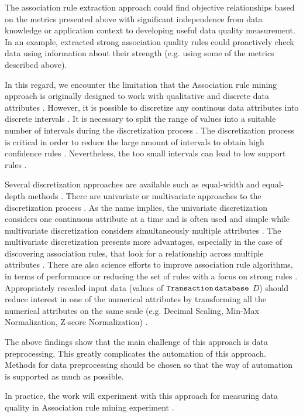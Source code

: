 		The association rule extraction approach could find objective relationships based on the metrics presented above with significant independence from data knowledge or application context to developing useful data quality measurement. In an example, extracted strong association quality rules could proactively check data using information about their strength (e.g. using some of the metrics described above).
		
		In this regard, we encounter the limitation that the Association rule mining approach is originally designed to work with qualitative and discrete data attributes   \cite{Moreno2007}. However, it is possible to discretize any continous data attributes into discrete intervals \cite{Moreno2007}. It is necessary to split the range of values into a suitable number of intervals during the discretization process \cite{Moreno2007}. The discretization process is critical in order to reduce the large amount of intervals to obtain high confidence rules \cite{Moreno2007}. Nevertheless, the too small intervals can lead to low support rules \cite{Moreno2007}.
		
		Several discretization approaches are available such as equal-width and equal-depth methods \cite{Moreno2007}. There are univariate or multivariate approaches to the discretization process \cite{Moreno2007}. As the name implies, the univariate discretization considers one continuous attribute at a time and is often used and simple while multivariate discretization considers simultaneously multiple attributes \cite{Moreno2007}. The multivariate discretization presents more advantages, especially in the case of discovering association rules, that look for a relationship across multiple attributes \cite{Moreno2007}. There are also science efforts to improve association rule algorithms, in terms of performance or reducing the set of rules with a focus on strong rules \cite{Liu2012}. Appropriately rescaled input data (values of ${\operatorname{\mathtt{Transaction}}}\,{\operatorname{\mathtt{database}}}$ $D$) should reduce interest in one of the numerical attributes by transforming all the numerical attributes on the same scale (e.g. Decimal Scaling, Min-Max Normalization, Z-score Normalization) \cite{Tan2013}.

		The above findings show that the main challenge of this approach is data preprocessing. This greatly complicates the automation of this approach. Methods for data preprocessing should be chosen so that the way of automation is supported as much as possible. 
							
		In practice, the work will experiment with this approach for measuring data quality in Association rule mining experiment .